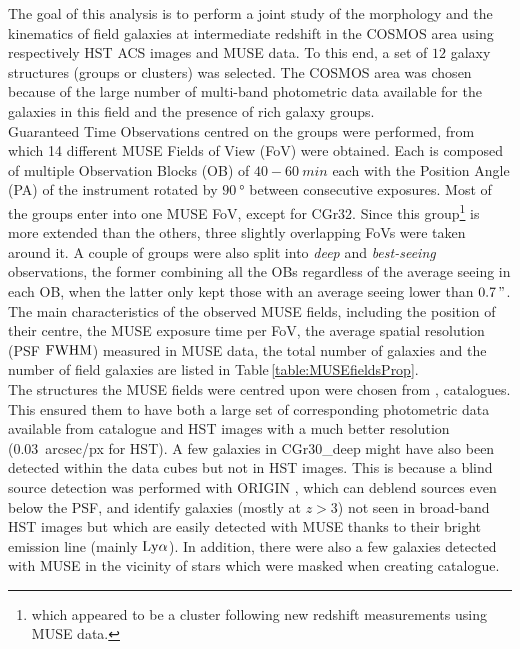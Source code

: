 The goal of this analysis is to perform a joint study of the morphology and the kinematics of field galaxies at intermediate redshift in the COSMOS area  using respectively HST ACS images and MUSE data. To this end, a set of $12$ galaxy structures (groups or clusters) was selected. The COSMOS area was chosen because of the large number of multi-band photometric data available for the galaxies in this field and the presence of rich galaxy groups.\\

Guaranteed Time Observations centred on the groups were performed, from which 14 different MUSE Fields of View (FoV) were obtained. Each is composed of multiple Observation Blocks (OB) of $40-\SI{60}{min}$ each with the Position Angle (PA) of the instrument rotated by $\SI{90}{\degree}$ between consecutive exposures. Most of the groups enter into one MUSE FoV, except for CGr32. Since this group\footnote{which appeared to be a cluster following new redshift measurements using MUSE data.} is more extended than the others, three slightly overlapping FoVs were taken around it. A couple of groups were also split into \textit{deep} and \textit{best-seeing} observations, the former combining all the OBs regardless of the average seeing in each OB, when the latter only kept those with an average seeing lower than $\SI{0.7}{"}$. The main characteristics of the observed MUSE fields, including the position of their centre, the MUSE exposure time per FoV, the average spatial resolution (PSF $\rm{FWHM}$) measured in MUSE data, the total number of galaxies and the number of field galaxies are listed in Table\,\ref{table:MUSEfieldsProp}. \\

The structures the MUSE fields were centred upon were chosen from ,  catalogues. This ensured them to have both a large set of corresponding photometric data available from  catalogue and HST images with a much better resolution (\SI{0.03}{arcsec/px} for HST). A few galaxies in CGr30\_deep might have also been detected within the data cubes but not in HST images. This is because a blind source detection was performed with ORIGIN , which can deblend sources even below the PSF, and identify galaxies (mostly at $z > 3$) not seen in broad-band HST images but which are easily detected with MUSE thanks to their bright emission line (mainly $\rm{Ly}\alpha$). In addition, there were also a few galaxies detected with MUSE in the vicinity of stars which were masked when creating  catalogue.

